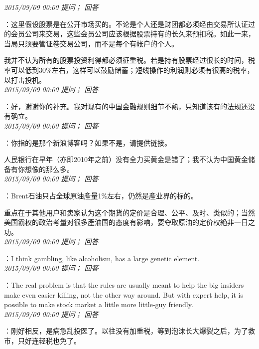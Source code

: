 \documentclass[twocolumn]{ctexart}
\begin{document}
\textit{\hfill\noindent\small 2015/09/09 00:00 提问； 回答}

：这里假设股票是在公开市场买的。不论是个人还是财团都必须经由交易所认证过的会员公司来交易，这些会员公司应该根据股票持有的长久来预扣税。如此一来，当局只须要管证卷交易公司，而不是每个有帐户的个人。

我并不认为所有的股票投资利得都必须征重税。若是持有股票经过很长的时间，税率可以低到30\%左右，这样可以鼓励储蓄；短线操作的利润则必须有很高的税率，以打击投机。\\

\textit{\hfill\noindent\small 2015/09/09 00:00 提问； 回答}

：好，谢谢你的补充。我对现有的中国金融规则细节不熟，只知道该有的法规还没有确立。\\

\textit{\hfill\noindent\small 2015/09/09 00:00 提问； 回答}

：你指的是那个新浪博客吗？如果不是，请提供链接。

人民银行在早年（亦即2010年之前）没有全力买黄金是错了；我不认为中国黄金储备有你想像的那么多。\\

\textit{\hfill\noindent\small 2015/09/09 00:00 提问； 回答}

：Brent石油只占全球原油產量1\%左右，仍然是產业界的标的。

重点在于其他用户和卖家认为这个期货的定价是合理、公平、及时、类似的；当然美国霸权的政治考量对很多產油国的态度有影响，要夺取原油的定价权絶非一日之功。\\

\textit{\hfill\noindent\small 2015/09/09 00:00 提问； 回答}

：I think gambling, like alcoholism, has a large genetic element.\\

\textit{\hfill\noindent\small 2015/09/09 00:00 提问； 回答}

：The real problem is that the rules are usually meant to help the big insiders make even easier killing, not the other way around. But with expert help, it is possible to make stock market a little more little-guy friendly.\\

\textit{\hfill\noindent\small 2015/09/09 00:00 提问； 回答}

：刚好相反，是病急乱投医了。以往没有加重税，等到泡沫长大爆裂之后，为了救市，只好连轻税也免了。
\end{document}
